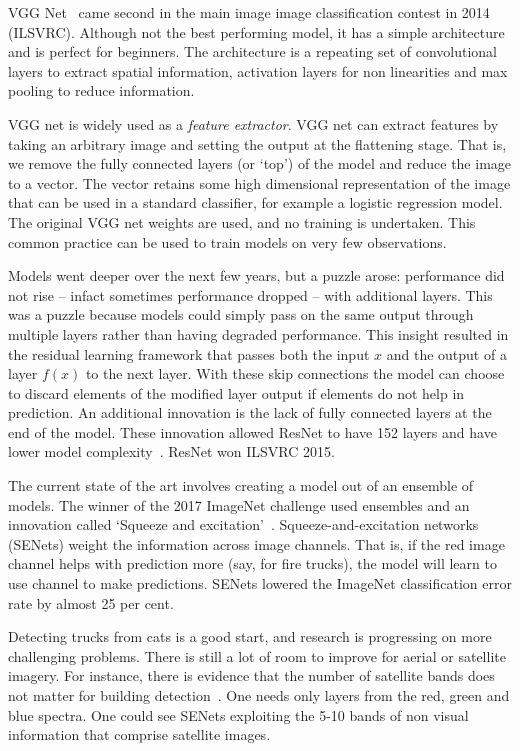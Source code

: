 \documentclass[12pt, a4paper, oneside, headinclude, footinclude]{article}
\begin{document}
VGG Net~\cite{SimonyanZ14a} came second in the main image image classification
contest in 2014 (ILSVRC). Although not the best performing model, it has a
simple architecture and is perfect for beginners.  The architecture is a
repeating set of convolutional layers to extract spatial information,
activation layers for non linearities and max pooling to reduce information.

VGG net is widely used as a \textit{feature extractor}. VGG net can extract
features by taking an arbitrary image and setting the output at the flattening
stage. That is, we remove the fully connected layers (or `top') of the model
and reduce the image to a vector. The vector retains some high dimensional
representation of the image that can be used in a standard classifier, for
example a logistic regression model. The original VGG net weights are used,
and no training is undertaken. This common practice can be used to train
models on very few observations.

Models went deeper over the next few years, but a puzzle arose: performance
did not rise -- infact sometimes performance dropped -- with additional
layers. This was a puzzle because models could simply pass on the same output
through multiple layers rather than having degraded performance. This insight
resulted in the residual learning framework that passes both the input $x$ and
the output of a layer $f(x)$ to the next layer. With these skip connections
the model can choose to discard elements of the modified layer output if
elements do not help in prediction. An additional innovation is the lack of
fully connected layers at the end of the model. These innovation allowed
ResNet to have 152 layers and have lower model complexity~\cite{he2016deep}.
ResNet won ILSVRC 2015.

The current state of the art involves creating a model out of an ensemble of
models. The winner of the 2017 ImageNet challenge used ensembles and an
innovation called `Squeeze and excitation'~\cite{wmw}. Squeeze-and-excitation
networks (SENets) weight the information across image channels. That is, if
the red image channel helps with prediction more (say, for fire trucks), the
model will learn to use channel to make predictions. SENets lowered the
ImageNet classification error rate by almost 25 per cent.  

Detecting trucks from cats is a good start, and research is progressing on more
challenging problems. There is still a lot of room to improve for aerial or
satellite imagery. For instance, there is evidence that the number of
satellite bands does not matter for building
detection~\cite{2017Panchromatic}. One needs only layers from the red, green
and blue spectra. One could see SENets exploiting the 5-10 bands of
non visual information that comprise satellite images.
\end{document}
